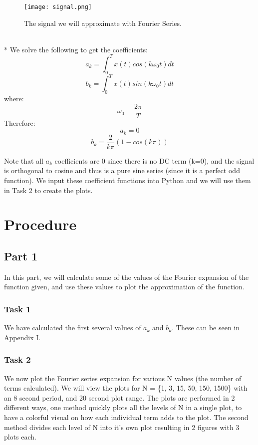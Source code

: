 \documentclass[12pt]{report}
\def\br{\hspace*{\fill} \\* }
\begin{document}
\begin{figure}[h]
\centering
 \texttt{[image: signal.png]}
 \caption{The signal we will approximate with Fourier Series.}
\end{figure}

\br  We solve the following to get the coefficients:
\[ a_k=\int_{0}^{T} x(t)cos(k\omega_0t) dt \]
\[ b_k=\int_{0}^{T} x(t)sin(k\omega_0t) dt \] where:
\[ \omega_0=\frac{2\pi}{T} \] Therefore: \[ a_k = 0 \]
\[ b_k = \frac{2}{k\pi}\left(1-cos(k\pi)\right) \]

Note that all \(a_k\) coefficients are 0 since there is no DC term
(k=0), and the signal is orthogonal to cosine and thus is a pure sine
series (since it is a perfect odd function). We input these coefficient
functions into Python and we will use them in Task 2 to create the
plots.

\hypertarget{procedure}{%
\chapter{Procedure}\label{procedure}}

\hypertarget{part-1}{%
\section{Part 1}\label{part-1}}

In this part, we will calculate some of the values of the Fourier
expansion of the function given, and use these values to plot the
approximation of the function.

\hypertarget{task-1}{%
\subsection{Task 1}\label{task-1}}

We have calculated the first several values of \(a_k\) and \(b_k\).
These can be seen in Appendix I.

\hypertarget{task-2}{%
\subsection{Task 2}\label{task-2}}

We now plot the Fourier series expansion for various N values (the
number of terms calculated). We will view the plots for N = \{1, 3, 15,
50, 150, 1500\} with an 8 second period, and 20 second plot range. The
plots are performed in 2 different ways, one method quickly plots all
the levels of N in a single plot, to have a colorful visual on how each
individual term adds to the plot. The second method divides each level
of N into it's own plot resulting in 2 figures with 3 plots each.
\end{document}
